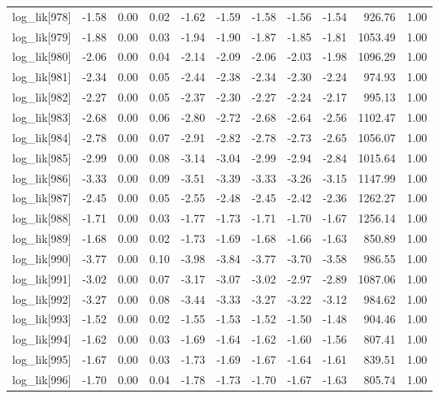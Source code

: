 \begin{table}[ht]
\begin{tabular}{rrrrrrrrrrr}
  log\_lik[978] & -1.58 & 0.00 & 0.02 & -1.62 & -1.59 & -1.58 & -1.56 & -1.54 & 926.76 & 1.00 \\ 
  log\_lik[979] & -1.88 & 0.00 & 0.03 & -1.94 & -1.90 & -1.87 & -1.85 & -1.81 & 1053.49 & 1.00 \\ 
  log\_lik[980] & -2.06 & 0.00 & 0.04 & -2.14 & -2.09 & -2.06 & -2.03 & -1.98 & 1096.29 & 1.00 \\ 
  log\_lik[981] & -2.34 & 0.00 & 0.05 & -2.44 & -2.38 & -2.34 & -2.30 & -2.24 & 974.93 & 1.00 \\ 
  log\_lik[982] & -2.27 & 0.00 & 0.05 & -2.37 & -2.30 & -2.27 & -2.24 & -2.17 & 995.13 & 1.00 \\ 
  log\_lik[983] & -2.68 & 0.00 & 0.06 & -2.80 & -2.72 & -2.68 & -2.64 & -2.56 & 1102.47 & 1.00 \\ 
  log\_lik[984] & -2.78 & 0.00 & 0.07 & -2.91 & -2.82 & -2.78 & -2.73 & -2.65 & 1056.07 & 1.00 \\ 
  log\_lik[985] & -2.99 & 0.00 & 0.08 & -3.14 & -3.04 & -2.99 & -2.94 & -2.84 & 1015.64 & 1.00 \\ 
  log\_lik[986] & -3.33 & 0.00 & 0.09 & -3.51 & -3.39 & -3.33 & -3.26 & -3.15 & 1147.99 & 1.00 \\ 
  log\_lik[987] & -2.45 & 0.00 & 0.05 & -2.55 & -2.48 & -2.45 & -2.42 & -2.36 & 1262.27 & 1.00 \\ 
  log\_lik[988] & -1.71 & 0.00 & 0.03 & -1.77 & -1.73 & -1.71 & -1.70 & -1.67 & 1256.14 & 1.00 \\ 
  log\_lik[989] & -1.68 & 0.00 & 0.02 & -1.73 & -1.69 & -1.68 & -1.66 & -1.63 & 850.89 & 1.00 \\ 
  log\_lik[990] & -3.77 & 0.00 & 0.10 & -3.98 & -3.84 & -3.77 & -3.70 & -3.58 & 986.55 & 1.00 \\ 
  log\_lik[991] & -3.02 & 0.00 & 0.07 & -3.17 & -3.07 & -3.02 & -2.97 & -2.89 & 1087.06 & 1.00 \\ 
  log\_lik[992] & -3.27 & 0.00 & 0.08 & -3.44 & -3.33 & -3.27 & -3.22 & -3.12 & 984.62 & 1.00 \\ 
  log\_lik[993] & -1.52 & 0.00 & 0.02 & -1.55 & -1.53 & -1.52 & -1.50 & -1.48 & 904.46 & 1.00 \\ 
  log\_lik[994] & -1.62 & 0.00 & 0.03 & -1.69 & -1.64 & -1.62 & -1.60 & -1.56 & 807.41 & 1.00 \\ 
  log\_lik[995] & -1.67 & 0.00 & 0.03 & -1.73 & -1.69 & -1.67 & -1.64 & -1.61 & 839.51 & 1.00 \\ 
  log\_lik[996] & -1.70 & 0.00 & 0.04 & -1.78 & -1.73 & -1.70 & -1.67 & -1.63 & 805.74 & 1.00 \\ 

\end{tabular}
\end{table}
